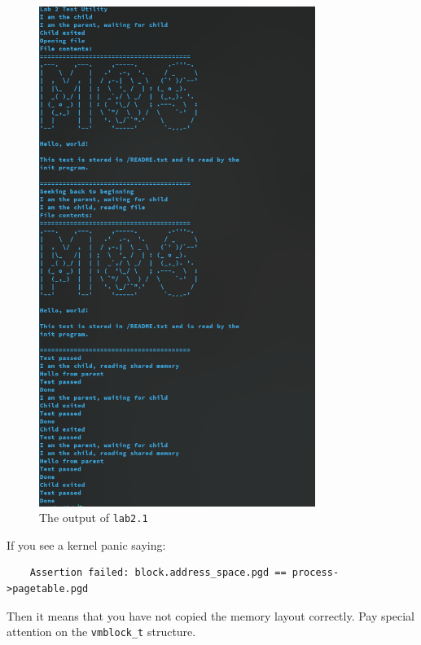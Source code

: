 \begin{figure}
    \centering
    \includegraphics[width=0.8\textwidth]{assets/c2.lab2.png}
    \caption{The output of \texttt{lab2.1}}
    \label{fig:lab2.1-fork}
\end{figure}

If you see a kernel panic saying:

\begin{verbatim}
    Assertion failed: block.address_space.pgd == process->pagetable.pgd
\end{verbatim}

Then it means that you have not copied the memory layout correctly.
Pay special attention on the \texttt{vmblock\_t} structure.
